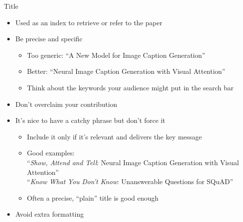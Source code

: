 \documentclass[usenames,dvipsnames,11pt,aspectratio=169]{beamer}
\begin{document}
\begin{frame}
    {Title}
    \begin{itemize}
        \item Used as an index to retrieve or refer to the paper
        \item Be precise and specific
            \begin{itemize}
                \item Too generic: ``A New Model for Image Caption Generation''
                \item Better: ``Neural Image Caption Generation with Visual Attention''
                \item Think about the keywords your audience might put in the search bar
            \end{itemize}
        \item Don't overclaim your contribution
        \item It's nice to have a catchy phrase but don't force it 
            \begin{itemize}
                \item Include it only if it's relevant and delivers the key message
                \item Good examples: \\
                    ``\emph{Show, Attend and Tell}: Neural Image Caption Generation with Visual Attention''\\
                    ``\emph{Know What You Don't Know}: Unanswerable Questions for SQuAD''
                \item Often a precise, ``plain'' title is good enough
            \end{itemize}
        \item Avoid extra formatting 
    \end{itemize}
\end{frame}
\end{document}
